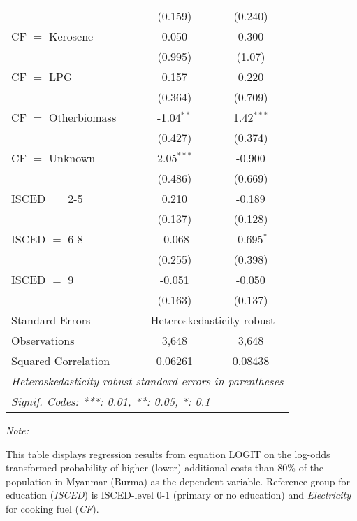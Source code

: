 \begin{table}[htbp!]
\begin{adjustbox}{width = 1\textwidth, max height = 0.95\textheight, center}
\begin{threeparttable}[b]
\begin{tabular}{lcc}
                                 & (0.159)       & (0.240)\\   
            CF $=$ Kerosene      & 0.050         & 0.300\\   
                                 & (0.995)       & (1.07)\\   
            CF $=$ LPG           & 0.157         & 0.220\\   
                                 & (0.364)       & (0.709)\\   
            CF $=$ Otherbiomass  & -1.04$^{**}$  & 1.42$^{***}$\\   
                                 & (0.427)       & (0.374)\\   
            CF $=$ Unknown       & 2.05$^{***}$  & -0.900\\   
                                 & (0.486)       & (0.669)\\   
            ISCED $=$ 2-5        & 0.210         & -0.189\\   
                                 & (0.137)       & (0.128)\\   
            ISCED $=$ 6-8        & -0.068        & -0.695$^{*}$\\   
                                 & (0.255)       & (0.398)\\   
            ISCED $=$ 9          & -0.051        & -0.050\\   
                                 & (0.163)       & (0.137)\\   
            \midrule 
            Standard-Errors & \multicolumn{2}{c}{Heteroskedasticity-robust} \\ 
            Observations         & 3,648         & 3,648\\  
            Squared Correlation  & 0.06261       & 0.08438\\  
            \midrule \midrule
            \multicolumn{3}{l}{\emph{Heteroskedasticity-robust standard-errors in parentheses}}\\
            \multicolumn{3}{l}{\emph{Signif. Codes: ***: 0.01, **: 0.05, *: 0.1}}\\
         \end{tabular}
         
         \begin{tablenotes}\item \medskip \textit{Note:}
            \item This table displays regression results from equation LOGIT on the log-odds transformed probability of higher (lower) additional costs than 80\% of the population in Myanmar (Burma) as the dependent variable. Reference group for education (\textit{ISCED}) is ISCED-level 0-1 (primary or no education) and \textit{Electricity} for cooking fuel (\textit{CF}).
         \end{tablenotes}
      \end{threeparttable}
   \end{adjustbox}
\end{table}


